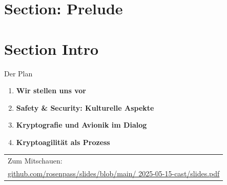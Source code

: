 \section{Section: Prelude}

\section{Section Intro}

\begin{frame}[c]{Der Plan}
  \small

  \begin{enumerate}
    \item \textbf{Wir stellen uns vor}
    \item \textbf{Safety \& Security: Kulturelle Aspekte}
    \item \textbf{Kryptografie und Avionik im Dialog}
    \item \textbf{Kryptoagilität als Prozess}
  \end{enumerate}

	\vfill

    {
      \begin{tabular}[c]{@{\space}l}
      Zum Mitschauen:\\
      \footnotesize\href{github.com/rosenpass/slides/blob/main/2025-05-15-cast/slides.pdf}{github.com/rosenpass/slides/blob/main/ 2025-05-15-cast/slides.pdf}
      \end{tabular}
    }
  \vfill
\end{frame}



